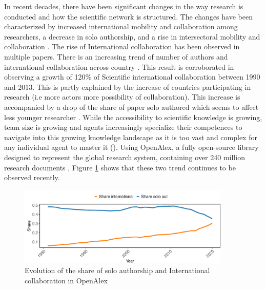 In recent decades, there have been significant changes in the way research is conducted and how the scientific network is structured. The changes have been characterized by increased international mobility and collaboration among researchers, a decrease in solo authorship, and a rise in intersectoral mobility and collaboration \citep{geuna2015global}. The rise of International collaboration has been observed in multiple papers. There is an increasing trend of number of authors and international collaboration across country \citep{adams2012rise}. This result is corroborated in \cite{wagner2017growth} observing a growth of 120\% of Scientific international collaboration between 1990 and 2013. This is partly explained by the increase of countries participating in research (i.e more actors more possibility of collaboration). This increase is accompanied by a drop of the share of paper solo authored which seems to affect less younger researcher \cite{kuld2018rise}. While the accessibility to scientific knowledge is growing, team size is growing and agents increasingly specialize their competences to navigate into this growing knowledge landscape as it is too vast and complex for any individual agent to master it (\cite{boudreau2016looking}). Using OpenAlex, a fully open-source library designed to represent the global research system, containing over 240 million research documents \cite{priem2022openalex}, Figure \ref{fig:1} shows that these two trend continues to be observed recently.

\begin{figure}[H]
\includegraphics[width=0.9\textwidth]{0_Introduction/figures/Fig1.pdf} %
\caption{Evolution of the share of solo authorship and International collaboration in OpenAlex}
\label{fig:1} 
\end{figure}

